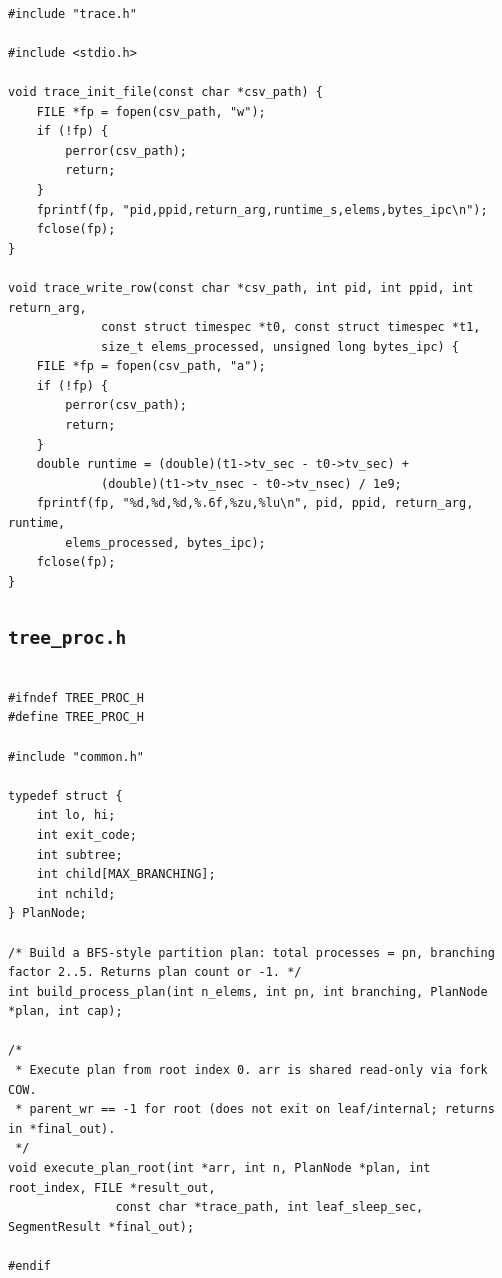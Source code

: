 \documentclass[11pt,a4paper]{article}
\begin{document}
\lstset{style=textbookc}\begin{lstlisting}[caption={File \texttt{trace.c}},label=lst:trace_c]

#include "trace.h"

#include <stdio.h>

void trace_init_file(const char *csv_path) {
	FILE *fp = fopen(csv_path, "w");
	if (!fp) {
		perror(csv_path);
		return;
	}
	fprintf(fp, "pid,ppid,return_arg,runtime_s,elems,bytes_ipc\n");
	fclose(fp);
}

void trace_write_row(const char *csv_path, int pid, int ppid, int return_arg,
		     const struct timespec *t0, const struct timespec *t1,
		     size_t elems_processed, unsigned long bytes_ipc) {
	FILE *fp = fopen(csv_path, "a");
	if (!fp) {
		perror(csv_path);
		return;
	}
	double runtime = (double)(t1->tv_sec - t0->tv_sec) +
			 (double)(t1->tv_nsec - t0->tv_nsec) / 1e9;
	fprintf(fp, "%d,%d,%d,%.6f,%zu,%lu\n", pid, ppid, return_arg, runtime,
		elems_processed, bytes_ipc);
	fclose(fp);
}

\end{lstlisting}\clearpage

\subsection{\texttt{tree_proc.h}}

\lstset{style=textbookc}\begin{lstlisting}[caption={File \texttt{tree\_proc.h}},label=lst:tree_proc_h]

#ifndef TREE_PROC_H
#define TREE_PROC_H

#include "common.h"

typedef struct {
	int lo, hi;
	int exit_code;
	int subtree;
	int child[MAX_BRANCHING];
	int nchild;
} PlanNode;

/* Build a BFS-style partition plan: total processes = pn, branching factor 2..5. Returns plan count or -1. */
int build_process_plan(int n_elems, int pn, int branching, PlanNode *plan, int cap);

/*
 * Execute plan from root index 0. arr is shared read-only via fork COW.
 * parent_wr == -1 for root (does not exit on leaf/internal; returns in *final_out).
 */
void execute_plan_root(int *arr, int n, PlanNode *plan, int root_index, FILE *result_out,
		       const char *trace_path, int leaf_sleep_sec, SegmentResult *final_out);

#endif

\end{lstlisting}\clearpage
\end{document}
